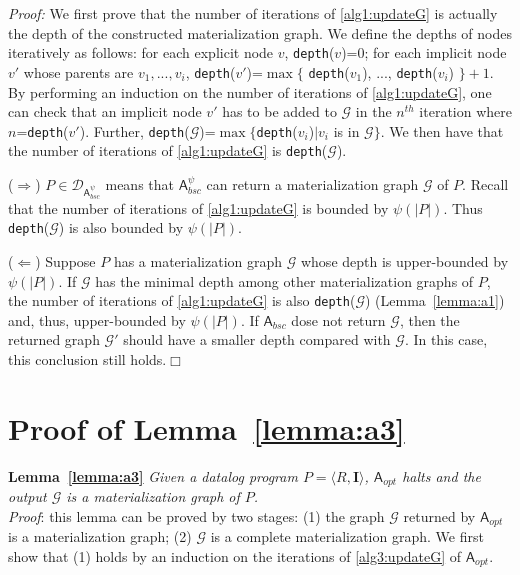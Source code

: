 \documentclass[final,1p,times]{elsarticle}
\begin{document}
\noindent\emph{Proof:} We first prove that the number of iterations of \ref{alg1:updateG}
is actually the depth of the constructed materialization graph.
We define the depths of nodes iteratively as follows:
for each explicit node $v$, \texttt{depth}($v$)=0;
for each implicit node $v'$ whose parents are $v_1,...,v_i$, \texttt{depth}($v'$)=$\max$$\{$ \texttt{depth}($v_1$), ..., \texttt{depth}($v_i$) $\}+1$.
By performing an induction on the number of iterations of \ref{alg1:updateG},
one can check that an implicit node $v'$ has to be added to $\mathcal{G}$ in the $n^{th}$ iteration
where $n$=\texttt{depth}($v'$).
Further, \texttt{depth}($\mathcal{G}$)=$\max$$\{$\texttt{depth}($v_i$)$|v_i$ is in $\mathcal{G}\}$.
We then have that the number of iterations of \ref{alg1:updateG} is \texttt{depth}($\mathcal{G}$).

($\Rightarrow$) $P\in\mathcal{D}_{\mathsf{A}_{bsc}^{\psi}}$ means that $\mathsf{A}_{bsc}^{\psi}$ can return
a materialization graph $\mathcal{G}$ of $P$.
Recall that the number of iterations of \ref{alg1:updateG} is bounded by $\psi(|P|)$.
Thus \texttt{depth}($\mathcal{G}$) is also bounded by $\psi(|P|)$.

($\Leftarrow$) Suppose $P$ has a materialization graph $\mathcal{G}$ whose depth
is upper-bounded by $\psi(|P|)$.
If $\mathcal{G}$ has the minimal depth among other materialization graphs of $P$,
the number of iterations of \ref{alg1:updateG} is also \texttt{depth}($\mathcal{G}$) (Lemma~\ref{lemma:a1})
and, thus, upper-bounded by $\psi(|P|)$.
If $\mathsf{A}_{bsc}$ dose not return $\mathcal{G}$, then the returned graph $\mathcal{G}'$
should have a smaller depth compared with $\mathcal{G}$.
In this case, this conclusion still holds.\hfill$\Box$

\section{Proof of Lemma~\ref{lemma:a3}}

\textbf{Lemma~\ref{lemma:a3}}
\emph{Given a datalog program $P=\langle R, \textbf{I}\rangle$,
$\mathsf{A}_{opt}$ halts and the output $\mathcal{G}$ is a materialization graph of $P$.}\\

\noindent\emph{Proof}: this lemma can be proved by two stages:
(1) the graph $\mathcal{G}$ returned by $\mathsf{A}_{opt}$ is a materialization graph;
(2) $\mathcal{G}$ is a complete materialization graph.
We first show that (1) holds by an induction on the iterations of \ref{alg3:updateG} of $\mathsf{A}_{opt}$.
\end{document}
